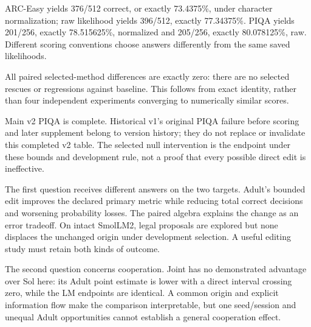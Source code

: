 
ARC-Easy yields 376/512 correct, or exactly 73.4375\%, under character normalization; raw likelihood yields 396/512, exactly 77.34375\%. PIQA yields 201/256, exactly 78.515625\%, normalized and 205/256, exactly 80.078125\%, raw. Different scoring conventions choose answers differently from the same saved likelihoods.

All paired selected-method differences are exactly zero: there are no selected rescues or regressions against baseline. This follows from exact identity, rather than four independent experiments converging to numerically similar scores.

Main v2 PIQA is complete. Historical v1's original PIQA failure before scoring and later supplement belong to version history; they do not replace or invalidate this completed v2 table. The selected null intervention is the endpoint under these bounds and development rule, not a proof that every possible direct edit is ineffective.

The first question receives different answers on the two targets. Adult's bounded edit improves the declared primary metric while reducing total correct decisions and worsening probability losses. The paired algebra explains the change as an error tradeoff. On intact SmolLM2, legal proposals are explored but none displaces the unchanged origin under development selection. A useful editing study must retain both kinds of outcome.

The second question concerns cooperation. Joint has no demonstrated advantage over Sol here: its Adult point estimate is lower with a direct interval crossing zero, while the LM endpoints are identical. A common origin and explicit information flow make the comparison interpretable, but one seed/session and unequal Adult opportunities cannot establish a general cooperation effect.

